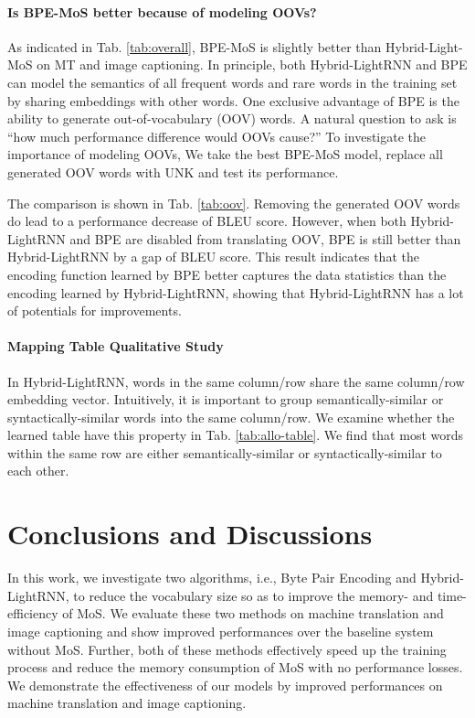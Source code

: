 \documentclass[letterpaper]{article} \usepackage{aaai19}  \usepackage{times}  \usepackage{helvet}  \usepackage{courier}  \usepackage{url}  \usepackage{graphicx}  \frenchspacing  \usepackage{booktabs}
\begin{document}
\paragraph{Is BPE-MoS better because of modeling OOVs?}
As indicated in Tab. \ref{tab:overall}, BPE-MoS is slightly better than Hybrid-Light-MoS on MT and image captioning. 
In principle, both Hybrid-LightRNN and BPE can model the semantics of all frequent words and rare words in the training set by sharing embeddings with other words. One exclusive advantage of BPE is the ability to generate out-of-vocabulary (OOV) words. A natural question to ask is ``how much performance difference  would OOVs cause?'' To investigate the importance of modeling OOVs, We take the best BPE-MoS model, replace all generated OOV words with UNK and test its performance.

The comparison is shown in Tab. \ref{tab:oov}. Removing the generated OOV words do lead to a performance decrease of  BLEU score. 
However, when both Hybrid-LightRNN and BPE are disabled from translating OOV, BPE is still better than Hybrid-LightRNN by a gap of  BLEU score. 
This result indicates that the encoding function learned by BPE better captures the data statistics than the encoding learned by Hybrid-LightRNN, showing that Hybrid-LightRNN has a lot of potentials for improvements.


\paragraph{Mapping Table Qualitative Study}
In Hybrid-LightRNN, words in the same column/row  share the same column/row embedding vector. 
Intuitively, it is important to group semantically-similar or syntactically-similar words into the same column/row. We examine whether the learned table have this property in Tab. \ref{tab:allo-table}. 
We find that most words within the same row are either semantically-similar or syntactically-similar to each other. 


\section{Conclusions and Discussions}

In this work, we investigate two algorithms, i.e., Byte Pair Encoding and Hybrid-LightRNN, to reduce the vocabulary size so as to improve the memory- and time-efficiency of MoS.
We evaluate these two methods on machine translation and image captioning and show improved performances over the baseline system without MoS. 
Further, both of these methods effectively speed up the training process and reduce the memory consumption of MoS with no performance losses.  
We demonstrate the effectiveness of our models by improved performances on machine translation and image captioning. 



\end{document}

